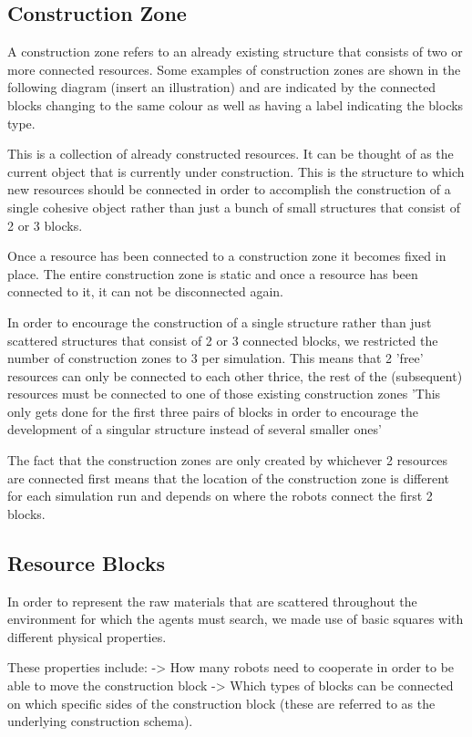 \subsection{Construction Zone}

A construction zone refers to an already existing structure that consists of two or more connected resources.
Some examples of construction zones are shown in the following diagram (insert an illustration) and are indicated by the connected blocks changing to the same colour as well as having a label indicating the blocks type.

This is a collection of already constructed resources. It can be thought of as the current object that is currently under construction. This is the structure to which new resources should be connected in order to accomplish the construction of a single cohesive object rather than just a bunch of small structures that consist of 2 or 3 blocks.

Once a resource has been connected to a construction zone it becomes fixed in place. The entire construction zone is static and once a resource has been connected to it, it can not be disconnected again.

In order to encourage the construction of a single structure rather than just scattered structures that consist of 2 or 3 connected blocks, we restricted the number of construction zones to 3 per simulation. This means that 2 'free' resources can only be connected to each other thrice, the rest of the (subsequent) resources must be connected to one of those existing construction zones 
'This only gets done for the first three pairs of blocks in order to encourage the development of a singular structure instead of several smaller ones'

The fact that the construction zones are only created by whichever 2 resources are connected first means that the location of the construction zone is different for each simulation run and depends on where the robots connect the first 2 blocks.

\subsection{Resource Blocks}

In order to represent the raw materials that are scattered throughout the environment for which the agents must search, we made use of basic squares with different physical properties.

These properties include:
-> How many robots need to cooperate in order to be able to move the construction block
-> Which types of blocks can be connected on which specific sides of the construction block (these are referred to as the underlying construction schema).

